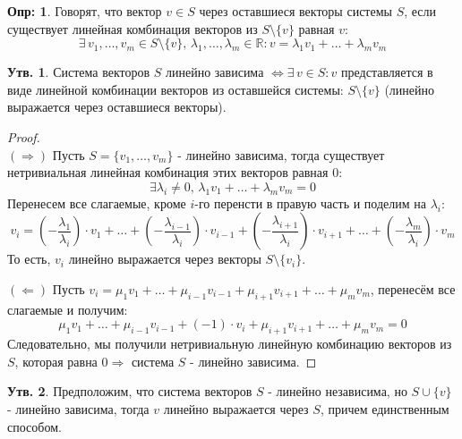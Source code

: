 \documentclass[12pt]{article}
\newcommand{\MR}{\mathbb{R}}
\theoremstyle{definition}
\newtheorem{defn}{Опр:}
\newtheorem{prop}{Утв.}
\begin{document}
\begin{defn}
	Говорят, что вектор $v \in S$  через оставшиеся векторы системы $S$, если существует линейная комбинация векторов из $S \setminus \{v\}$ равная $v$:
	$$
		\exists \, v_1 ,\dotsc, v_m \in S \setminus \{v\}, \, \lambda_1 ,\dotsc, \lambda_m \in \MR \colon v = \lambda_1 v_1 + \dotsc + \lambda_m v_m
	$$
\end{defn}
\begin{prop}
	Система векторов $S$ линейно зависима $\Leftrightarrow \exists \, v \in S \colon v$ представляется в виде линейной комбинации векторов из оставшейся системы: $S \setminus \{v\}$ (линейно выражается через оставшиеся векторы). 
\end{prop}
\begin{proof}\hfill\\
	$(\Rightarrow)$ Пусть $S = \{v_1,\dotsc, v_m\}$ - линейно зависима, тогда существует нетривиальная линейная комбинация этих векторов равная $0$:
	$$
		\exists \lambda_i \neq 0, \, \lambda_1 v_1 + \dotsc + \lambda_m v_m = 0
	$$	
	Перенесем все слагаемые, кроме $i$-го перенсти в правую часть и поделим на $\lambda_i$:
	$$
		v_i = \left(-\dfrac{\lambda_1}{\lambda_i}\right){\cdot}v_1 + \dotsc + \left(-\dfrac{\lambda_{i-1}}{\lambda_i}\right){\cdot}v_{i-1} + \left(-\dfrac{\lambda_{i+1}}{\lambda_i}\right){\cdot}v_{i + 1} + \dotsc + \left(-\dfrac{\lambda_m}{\lambda_i}\right){\cdot}v_m
	$$
	То есть, $v_i$ линейно выражается через векторы $S \setminus \{v_i\}$.
	
	$(\Leftarrow)$ Пусть $v_i = \mu_1 v_1 + \dotsc + \mu_{i-1}v_{i-1} + \mu_{i+1}v_{i+1} + \dotsc + \mu_m v_m$, перенесём все слагаемые и получим:
	$$
		\mu_1 v_1 + \dotsc + \mu_{i-1}v_{i-1} + (-1){\cdot}v_i + \mu_{i+1}v_{i+1} + \dotsc + \mu_m v_m = 0
	$$
	Следовательно, мы получили нетривиальную линейную комбинацию векторов из $S$, которая равна $0 \Rightarrow$ система $S$ - линейно зависима.
\end{proof}
\begin{prop}
	Предположим, что система векторов $S$ - линейно независима, но $S \cup \{v\}$ - линейно зависима, тогда $v$ линейно выражается через $S$, причем единственным способом.
\end{prop}
\end{document}
